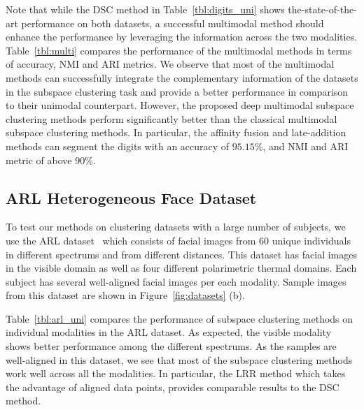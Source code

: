 \documentclass[journal]{IEEEtran}
\begin{document}
Note that while the DSC method in Table~\ref{tbl:digits_uni} shows the-state-of-the-art performance on both datasets, a successful multimodal method should enhance the performance by leveraging the information across the two modalities.		   Table~\ref{tbl:multi} compares the performance of the multimodal methods in terms of accuracy, NMI and ARI metrics.		  We observe that most of the multimodal methods can successfully integrate the complementary information of the datasets in the subspace clustering task and provide a better performance in comparison to their unimodal counterpart.    However, the proposed deep multimodal subspace clustering methods perform significantly better than the classical multimodal subspace clustering methods.  In particular, the affinity fusion and late-addition methods can segment the digits with an accuracy of $95.15\%$, and NMI and ARI metric of above $90\%$.



\subsection{ARL Heterogeneous Face Dataset}
To test our methods on clustering datasets with a large number of subjects, we use the ARL dataset~\cite{hu2016polarimetric} which consists of facial images from 60 unique individuals in different spectrums and from different distances.		  This dataset has  facial images in the visible domain as well as  four different polarimetric thermal domains.		        Each subject has several well-aligned facial images per each modality.		         Sample images from this dataset are shown in Figure~\ref{fig:datasets} (b).  

Table~\ref{tbl:arl_uni} compares the performance of subspace clustering methods on individual modalities in the ARL dataset.		 As expected, the visible modality shows better performance among the different spectrums.	  As the samples are well-aligned in this dataset, we see that most of the subspace clustering methods work well across all the modalities.    In particular, the LRR method which takes the advantage of aligned data points, provides comparable results to the DSC method.
\end{document}
